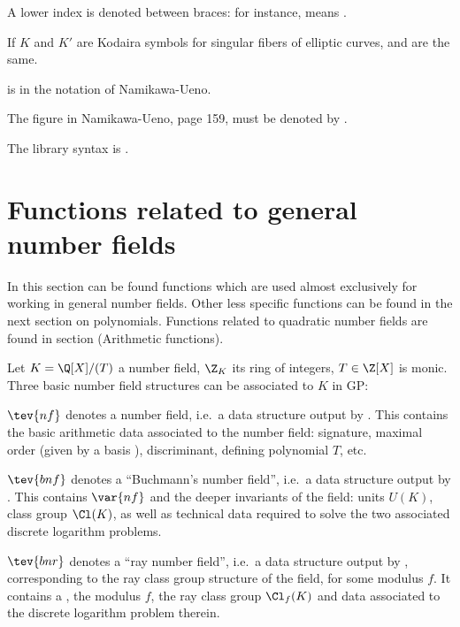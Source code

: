 \item A lower index is denoted between braces: for instance,  means \kbd{[I\_2-II-5]}.

\item If $K$ and $K'$ are Kodaira symbols for singular fibers of elliptic
curves, \kbd{[$K$-$K'$-m]} and \kbd{[$K'$-$K$-m]} are the same.

\item \kbd{[$K$-$K'$-$-1$]}  is \kbd{[$K'$-$K$-$\alpha$]} in the notation of
Namikawa-Ueno.

\item The figure \kbd{[2I\_0-m]} in Namikawa-Ueno, page 159, must be denoted
by \kbd{[2I\_0-(m+1)]}.

The library syntax is .

\section{Functions related to general number fields}

In this section can be found functions which are used almost exclusively for
working in general number fields. Other less specific functions can be found
in the next section on polynomials. Functions related to quadratic number
fields are found in section  (Arithmetic functions).


Let $K = \Q[X] / (T)$ a number field, $\Z_K$ its ring of integers, $T\in\Z[X]$
is monic. Three basic number field structures can be associated to $K$ in
GP:

\item $\tev{nf}$ denotes a number field, i.e.~a data structure output by
. This contains the basic arithmetic data associated to the
number field: signature, maximal order (given by a basis ),
discriminant, defining polynomial $T$, etc.

\item $\tev{bnf}$ denotes a ``Buchmann's number field'', i.e.~a
data structure output by . This contains
$\var{nf}$ and the deeper invariants of the field: units $U(K)$, class group
$\Cl(K)$, as well as technical data required to solve the two associated
discrete logarithm problems.

\item $\tev{bnr}$ denotes a ``ray number field'', i.e.~a data structure
output by , corresponding to the ray class group structure of
the field, for some modulus $f$. It contains a , the modulus
$f$, the ray class group $\Cl_f(K)$ and data associated to
the discrete logarithm problem therein.

